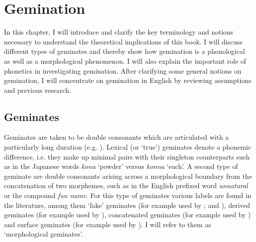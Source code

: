 \chapter{Gemination} \label{Gemination}


In this chapter, I will introduce and clarify the key terminology and notions necessary to understand the theoretical implications of this book. I will discuss different types of geminates and thereby show how gemination is a phonological as well as a morphological phenomenon. I will also explain the important role of phonetics in investigating gemination. After clarifying some general notions on gemination, I will concentrate on gemination in English by reviewing assumptions and previous research. 

\section{Geminates} \label{what is gemination}

Geminates are taken to be double consonants which are articulated with a particularly long duration (e.g. \citealt{Hartmann.1972, Catford.1988, Trask.1996, Matthews.1997, Crystal.2008,Davis.2011, Galea.2016}). Lexical (or `true') geminates denote a phonemic difference, i.e. they make up minimal pairs with their singleton counterparts such as in the Japanese words  \textit{kona} ‘powder’ versus \textit{konna} ‘such'. A second type of geminate are double consonants arising across a morphological boundary from the concatenation of two morphemes, such as in the English prefixed word \textit{unnatural} or the compound \textit{fun name}. For this type of geminates various labels are found in the literature, among them `fake' geminates (for example used by \citealt{Hayes.1986b}; \citealt{Oh.2012} and \citealt{Kotzor.2016}), derived geminates (for example used by \citealt{Kubozono.2017b}), concatenated geminates (for example used by \citealt{Ridouane.2010}) and surface geminates (for example used by \citealt{Lahiri.1988, Galea.2016}). I will refer to them as ‘morphological geminates'.


